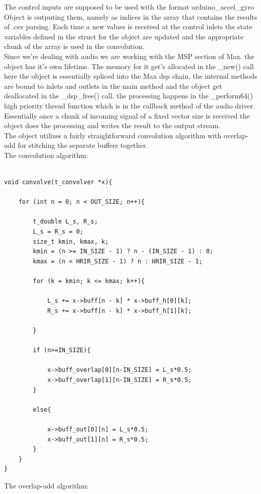 \documentclass[a4paper,12pt,oneside]{article}
\begin{document}
The control inputs are supposed to be used with the format arduino\_accel\_gyro Object is outputing them, namely as indices in the array that contains the results of .csv parsing. Each time a new values is received at the control inlets the state variables defined in the struct for the object are updated and the appropriate chunk of the array is used in the convolution.\\
Since we're dealing with audio we are working with the MSP section of Max. the object has it's own lifetime. The memory for it get's allocated in the \_new() call here the object is essentially spliced into the Max dsp chain, the internal methods are bound to inlets and outlets in the main method and the object get deallocated in the \_dsp\_free() call. the processing happens in the \_perform64() high priority thread function which is in the callback method of the audio driver. Essentially once a chunk of incoming signal of a fixed vector size is received the object does the processing and writes the result to the output stream.\\
The object utilizes a fairly straightforward convolution algorithm with overlap-add for stitching the separate buffers together.\\

The convolution algorithm:


\begin{verbatim}

void convolve(t_convolver *x){

	for (int n = 0; n < OUT_SIZE; n++){

		t_double L_s, R_s;
		L_s = R_s = 0;
		size_t kmin, kmax, k;
		kmin = (n >= IN_SIZE - 1) ? n - (IN_SIZE - 1) : 0;
		kmax = (n < HRIR_SIZE - 1) ? n : HRIR_SIZE - 1;

		for (k = kmin; k <= kmax; k++){
        
			L_s += x->buff[n - k] * x->buff_h[0][k];
			R_s += x->buff[n - k] * x->buff_h[1][k];

		}
		
		if (n>=IN_SIZE){
        
			x->buff_overlap[0][n-IN_SIZE] = L_s*0.5;
			x->buff_overlap[1][n-IN_SIZE] = R_s*0.5;
		}
        
		else{
        
			x->buff_out[0][n] = L_s*0.5;
			x->buff_out[1][n] = R_s*0.5;
		}
	}
}

\end{verbatim}

The overlap-add algorithm:
\end{document}
